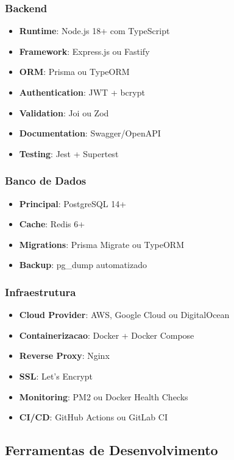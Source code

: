 \subsubsection{Backend}
\begin{itemize}
    \item \textbf{Runtime}: Node.js 18+ com TypeScript
    \item \textbf{Framework}: Express.js ou Fastify
    \item \textbf{ORM}: Prisma ou TypeORM
    \item \textbf{Authentication}: JWT + bcrypt
    \item \textbf{Validation}: Joi ou Zod
    \item \textbf{Documentation}: Swagger/OpenAPI
    \item \textbf{Testing}: Jest + Supertest
\end{itemize}

\subsubsection{Banco de Dados}
\begin{itemize}
    \item \textbf{Principal}: PostgreSQL 14+
    \item \textbf{Cache}: Redis 6+
    \item \textbf{Migrations}: Prisma Migrate ou TypeORM
    \item \textbf{Backup}: pg\_dump automatizado
\end{itemize}

\subsubsection{Infraestrutura}
\begin{itemize}
    \item \textbf{Cloud Provider}: AWS, Google Cloud ou DigitalOcean
    \item \textbf{Containerizacao}: Docker + Docker Compose
    \item \textbf{Reverse Proxy}: Nginx
    \item \textbf{SSL}: Let's Encrypt
    \item \textbf{Monitoring}: PM2 ou Docker Health Checks
    \item \textbf{CI/CD}: GitHub Actions ou GitLab CI
\end{itemize}

\subsection{Ferramentas de Desenvolvimento}

